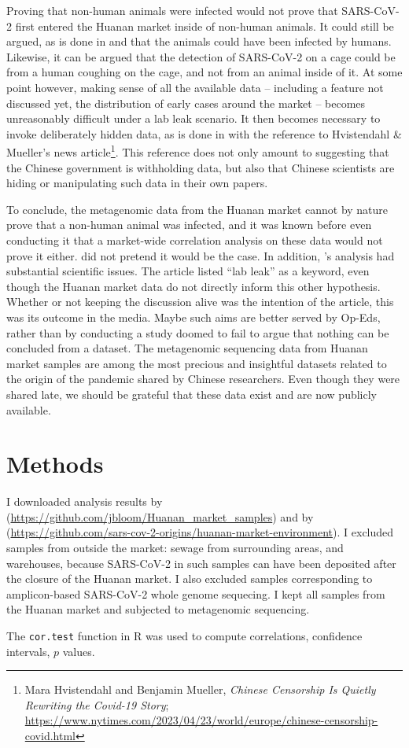 \documentclass[11pt]{article}
\def \sct {\mbox{SARS-CoV-2}}
\begin{document}
Proving that non-human animals were infected would not prove that \sct{} first entered the Huanan market inside of non-human animals. It could still be argued, as is done in \citet{Liu2023Nature} and \citet{Bloom2023VE} that the animals could have been infected by humans. Likewise, it can be argued that the detection of \sct{} on a cage could be from a human coughing on the cage, and not from an animal inside of it. At some point however, making sense of all the available data -- including a feature not discussed yet, the distribution of early cases around the market \citep{Worobey2022Science} -- becomes unreasonably difficult under a lab leak scenario. It then becomes necessary to invoke deliberately hidden data, as is done in \citet{Bloom2023VE} with the reference to Hvistendahl \& Mueller's news article\footnote{Mara Hvistendahl and Benjamin Mueller, \textit{Chinese Censorship Is Quietly Rewriting the Covid-19 Story}; \url{https://www.nytimes.com/2023/04/23/world/europe/chinese-censorship-covid.html}}. This reference does not only amount to suggesting that the Chinese government is withholding data, but also that Chinese scientists are hiding or manipulating such data in their own papers. 

To conclude, the metagenomic data from the Huanan market cannot by nature prove that a non-human animal was infected, and it was known before even conducting it that a market-wide correlation analysis on these data would not prove it either. \citet{ACC2023Zenodo} did not pretend it would be the case. In addition, \citet{Bloom2023VE}'s analysis had substantial scientific issues. The article listed ``lab leak'' as a keyword, even though the Huanan market data do not directly inform this other hypothesis. Whether or not keeping the discussion alive was the intention of the article, this was its outcome in the media. Maybe such aims are better served by Op-Eds, rather than by conducting a study doomed to fail to argue that nothing can be concluded from a dataset. The metagenomic sequencing data from Huanan market samples are among the most precious and insightful datasets related to the origin of the pandemic shared by Chinese researchers. Even though they were shared late, we should be grateful that these data exist and are now publicly available.        

\section{Methods}
I downloaded analysis results by \citet{Bloom2023VE} (\url{https://github.com/jbloom/Huanan_market_samples}) and by \citet{ACC2023bioRxiv} (\url{https://github.com/sars-cov-2-origins/huanan-market-environment}). I excluded samples from outside the market: sewage from surrounding areas, and warehouses, because \sct{} in such samples can have been deposited after the closure of the Huanan market. I also excluded samples corresponding to amplicon-based \sct{} whole genome sequecing. I kept all samples from the Huanan market and subjected to metagenomic sequencing.  

The \texttt{cor.test} function in R was used to compute correlations, confidence intervals, $p$ values.




\end{document}
